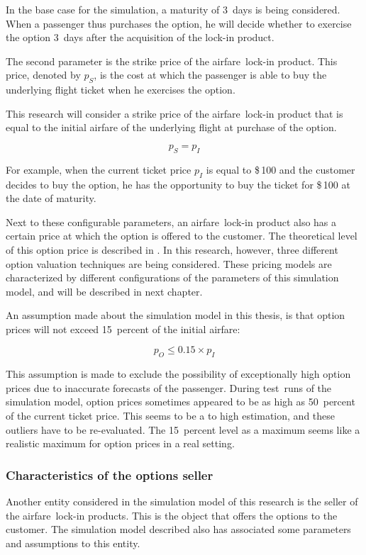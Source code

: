 In the base case for the simulation, a maturity of 3~days is being considered. When a passenger thus purchases the option, he will decide whether to exercise the option 3~days after the acquisition of the lock-in product.

The second parameter is the strike price of the airfare~lock-in product. This price, denoted by $p_S$, is the cost at which the passenger is able to buy the underlying flight ticket when he exercises the option.

This research will consider a strike price of the airfare~lock-in product that is equal to the initial airfare of the underlying flight at purchase of the option.

$$p_S = p_I$$

For example, when the current ticket price $p_I$ is equal to \$\,100 and the customer decides to buy the option, he has the opportunity to buy the ticket for \$\,100 at the date of maturity.  

Next to these configurable parameters, an airfare~lock-in product also has a certain price at which the option is offered to the customer. The theoretical level of this option price is described in . In this research, however, three different option valuation techniques are being considered. These pricing models are characterized by different configurations of the parameters of this simulation model, and will be described in next chapter. 

An assumption made about the simulation model in this thesis, is that option prices will not exceed 15~percent of the initial airfare:

$$p_O \le 0.15 \times p_I$$

This assumption is made to exclude the possibility of exceptionally high option prices due to inaccurate forecasts of the passenger. During test~runs of the simulation model, option prices sometimes appeared to be as high as 50~percent of the current ticket price. This seems to be a to high estimation, and these outliers have to be re-evaluated. The 15~percent level as a maximum seems like a realistic maximum for option prices in a real setting.


\subsubsection{Characteristics of the options seller}
Another entity considered in the simulation model of this research is the seller of the airfare~lock-in products. This is the object that offers the options to the customer. The simulation model described also has associated some parameters and assumptions to this entity.

